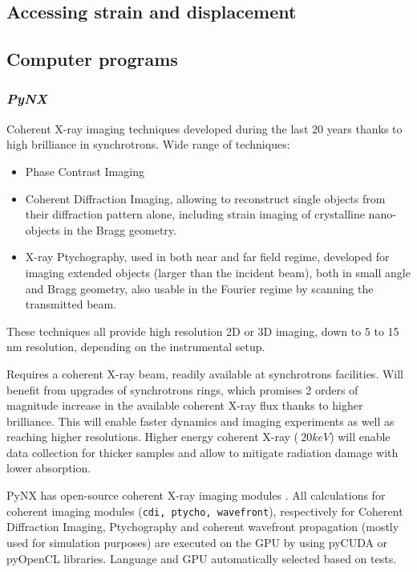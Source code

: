 \subsection{Accessing strain and displacement}


\subsection{Computer programs}

\subsubsection{\textit{PyNX}}
Coherent X-ray imaging techniques developed during the last 20 years thanks to high brilliance in synchrotrons. Wide range of techniques:

\begin{itemize}
    \item Phase Contrast Imaging
    \item Coherent Diffraction Imaging, allowing to reconstruct single objects from their diffraction pattern alone, including strain imaging of crystalline nano-objects in the Bragg geometry.
    \item X-ray Ptychography, used in both near and far field regime, developed for imaging extended objects (larger than the incident beam), both in small angle and Bragg geometry, also usable in the Fourier regime by scanning the transmitted beam.
\end{itemize}
These techniques all provide high resolution 2D or 3D imaging, down to 5 to 15 nm resolution, depending on the instrumental setup.

Requires a coherent X-ray beam, readily available at synchrotrons facilities. Will benefit from upgrades of synchrotrons rings, which promises 2 orders of magnitude increase in the available coherent X-ray flux thanks to higher brilliance. This will enable faster dynamics and imaging experiments as well as reaching higher resolutions.
Higher energy coherent X-ray ($\>20 keV$) will enable data collection for thicker samples and allow to mitigate radiation damage with lower absorption.

PyNX has open-source coherent X-ray imaging modules \parencite{Favre-Nicolin2020}. All calculations for coherent imaging modules (\texttt{cdi, ptycho, wavefront}), respectively for Coherent Diffraction Imaging, Ptychography and coherent wavefront propagation (mostly used for simulation purposes) are executed on the GPU by using pyCUDA or pyOpenCL libraries. Language and GPU automatically selected based on tests.

